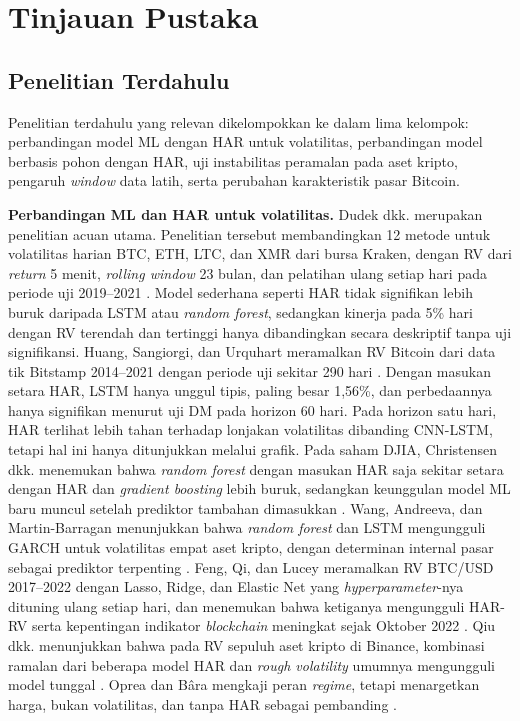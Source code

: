 \chapter{Tinjauan Pustaka}


\section{Penelitian Terdahulu}
Penelitian terdahulu yang relevan dikelompokkan ke dalam lima kelompok:
perbandingan model ML dengan HAR untuk volatilitas, perbandingan model berbasis
pohon dengan HAR, uji instabilitas peramalan pada aset kripto, pengaruh
\textit{window} data latih, serta perubahan karakteristik pasar Bitcoin.

\textbf{Perbandingan ML dan HAR untuk volatilitas.} Dudek dkk. merupakan
penelitian acuan utama. Penelitian tersebut membandingkan 12 metode untuk
volatilitas harian BTC, ETH, LTC, dan XMR dari bursa Kraken, dengan RV dari
\textit{return} 5 menit, \textit{rolling window} 23 bulan, dan pelatihan ulang
setiap hari pada periode uji 2019--2021 \cite{dudek2024}. Model sederhana
seperti HAR tidak signifikan lebih buruk daripada LSTM atau \textit{random
forest}, sedangkan kinerja pada 5\% hari dengan RV terendah dan tertinggi hanya
dibandingkan secara deskriptif tanpa uji signifikansi. Huang, Sangiorgi, dan
Urquhart meramalkan RV Bitcoin dari data tik Bitstamp 2014--2021 dengan periode
uji sekitar 290 hari \cite{huang2024}. Dengan masukan setara HAR, LSTM hanya
unggul tipis, paling besar 1,56\%, dan perbedaannya hanya signifikan menurut uji
DM pada horizon 60 hari. Pada horizon satu hari, HAR terlihat lebih tahan
terhadap lonjakan volatilitas dibanding CNN-LSTM, tetapi hal ini hanya
ditunjukkan melalui grafik. Pada saham DJIA, Christensen dkk. menemukan bahwa
\textit{random forest} dengan masukan HAR saja sekitar setara dengan HAR dan
\textit{gradient boosting} lebih buruk, sedangkan keunggulan model ML baru
muncul setelah prediktor tambahan dimasukkan \cite{christensen2023}. Wang,
Andreeva, dan Martin-Barragan menunjukkan bahwa \textit{random forest} dan LSTM
mengungguli GARCH untuk volatilitas empat aset kripto, dengan determinan
internal pasar sebagai prediktor terpenting \cite{wang2023}. Feng, Qi, dan
Lucey meramalkan RV BTC/USD 2017--2022 dengan Lasso, Ridge, dan Elastic Net
yang \textit{hyperparameter}-nya dituning ulang setiap hari, dan menemukan
bahwa ketiganya mengungguli HAR-RV serta kepentingan indikator
\textit{blockchain} meningkat sejak Oktober 2022 \cite{feng2024ml}. Qiu dkk.
menunjukkan bahwa pada RV sepuluh aset kripto di Binance, kombinasi ramalan
dari beberapa model HAR dan \textit{rough volatility} umumnya mengungguli model
tunggal \cite{qiu2025}. Oprea dan Bâra mengkaji peran \textit{regime}, tetapi
menargetkan harga, bukan volatilitas, dan tanpa HAR sebagai pembanding
\cite{oprea2026}.

